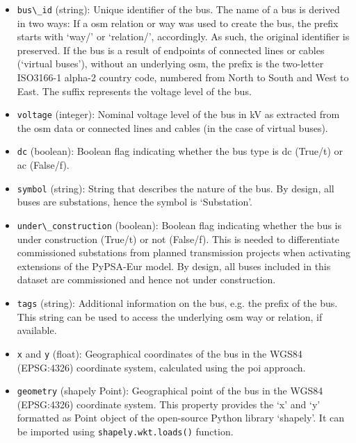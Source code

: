 \documentclass[fleqn,10pt]{wlscirep}
\let\autocite\cite
\newcommand{\colorcode}[1]{\colorbox{gray!20}{\lstinline|#1|}}
\begin{document}
\begin{itemize}
    \item \colorcode{bus\_id} (string): Unique identifier of the bus. The name of a bus is derived in two ways: If a \acrshort{osm} 
    relation or way was used to create the bus, the prefix starts with `way/' or `relation/', accordingly. As such, the original identifier is preserved. If the bus is a result of endpoints of connected lines or cables (`virtual buses'), without an underlying \acrshort{osm}, the prefix is the two-letter ISO3166-1 alpha-2 country code, numbered from North to South and West to East. The suffix represents the voltage level of the bus.
    \item \colorcode{voltage} (integer): Nominal voltage level of the bus in \si{\kilo\volt} as extracted from the \acrshort{osm} data or connected lines and cables (in the case of virtual buses).
    \item \colorcode{dc} (boolean): Boolean flag indicating whether the bus type is \acrshort{dc} (True/t) or \acrshort{ac} (False/f).
    \item \colorcode{symbol} (string): String that describes the nature of the bus. By design, all buses are substations, hence the symbol is `Substation'.
    \item \colorcode{under\_construction} (boolean): Boolean flag indicating whether the bus is under construction (True/t) or not (False/f). This is needed to differentiate commissioned substations from planned transmission projects when activating extensions of the PyPSA-Eur model. By design, all buses included in this dataset are commissioned and hence not under construction.
    \item \colorcode{tags} (string): Additional information on the bus, e.g. the prefix of the bus. This string can be used to access the underlying \acrshort{osm} way or relation, if available.
    \item \colorcode{x} and \colorcode{y} (float): Geographical coordinates of the bus in the WGS84 (EPSG:4326) coordinate system, calculated using the \acrshort{poi} approach.\autocite{garcia-castellanosPolesInaccessibilityCalculation2007}
    \item \colorcode{geometry} (shapely Point): Geographical point of the bus in the WGS84 (EPSG:4326) coordinate system. This property provides the `x' and `y' formatted as Point object of the open-source Python library `shapely'.\cite{gilliesShapely2024} It can be imported using \colorcode{shapely.wkt.loads()} function.
\end{itemize}
\end{document}
